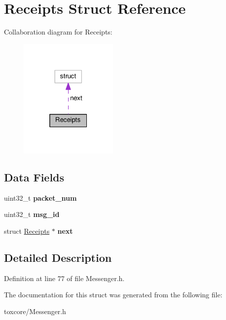 \hypertarget{struct_receipts}{\section{Receipts Struct Reference}
\label{struct_receipts}
}


Collaboration diagram for Receipts\+:
\nopagebreak
\begin{figure}[H]
\begin{center}
\leavevmode
\includegraphics[width=136pt]{struct_receipts__coll__graph}
\end{center}
\end{figure}
\subsection*{Data Fields}
\begin{DoxyCompactItemize}
\item 
\hypertarget{struct_receipts_a3110fa374a202ca37de05e1bb9c95f17}{uint32\+\_\+t {\bfseries packet\+\_\+num}}\label{struct_receipts_a3110fa374a202ca37de05e1bb9c95f17}

\item 
\hypertarget{struct_receipts_a8d62bc717240dc62a7c3595d7b2a75ff}{uint32\+\_\+t {\bfseries msg\+\_\+id}}\label{struct_receipts_a8d62bc717240dc62a7c3595d7b2a75ff}

\item 
\hypertarget{struct_receipts_a4cf1c9c7aa66ba420c540e3070555c89}{struct \hyperlink{struct_receipts}{Receipts} $\ast$ {\bfseries next}}\label{struct_receipts_a4cf1c9c7aa66ba420c540e3070555c89}

\end{DoxyCompactItemize}


\subsection{Detailed Description}


Definition at line 77 of file Messenger.\+h.



The documentation for this struct was generated from the following file\+:\begin{DoxyCompactItemize}
\item 
toxcore/Messenger.\+h\end{DoxyCompactItemize}
